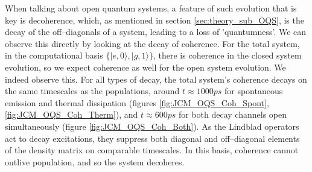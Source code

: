 \documentclass[11pt]{article}
\begin{document}
When talking about open quantum systems, a feature of such evolution that is key is decoherence, which, as mentioned in section \ref{sec:theory_sub_OQS}, is the decay of the off--diagonals of a system, leading to a loss of 'quantumness'. We can observe this directly by looking at the decay of coherence. For the total system, in the computational basis $\{|e,0\rangle, |g,1\rangle\}$, there is coherence in the closed system evolution, so we expect coherence as well for the open system evolution. We indeed observe this. For all types of decay, the total system's coherence decays on the same timescales as the populations, around $t \approx 1000ps$ for spontaneous emission and thermal dissipation (figures \ref{fig:JCM_OQS_Coh_Spont}, \ref{fig:JCM_OQS_Coh_Therm}), and $ t \approx 600ps$ for both decay channels open simultaneously (figure \ref{fig:JCM_OQS_Coh_Both}). As the Lindblad operators act to decay excitations, they suppress both diagonal and off–diagonal elements of the density matrix on comparable timescales. In this basis, coherence cannot outlive population, and so the system decoheres.\\
\\
\end{document}
